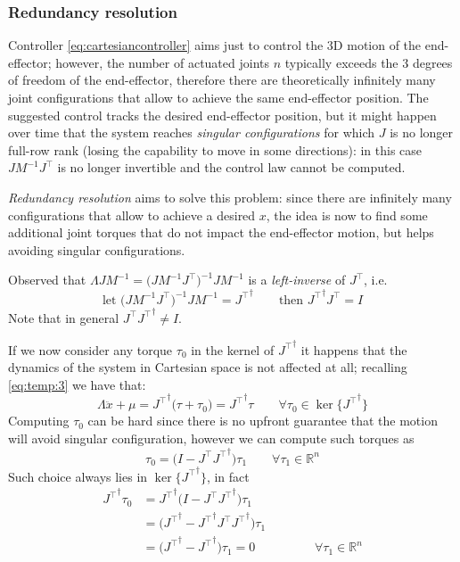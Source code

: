 	\subsubsection{Redundancy resolution} \label{sssec:redundancy}
	Controller \eqref{eq:cartesiancontroller} aims just to control the 3D motion of the end-effector; however, the number of actuated joints $n$ typically exceeds the 3 degrees of freedom of the end-effector, therefore there are theoretically infinitely many joint configurations that allow to achieve the same end-effector position. The suggested control tracks the desired end-effector position, but it might happen over time that the system reaches \textit{singular configurations} for which $J$ is no longer full-row rank (losing the capability to move in some directions): in this case $JM^{-1}J^\top$ is no longer invertible and the control law cannot be computed.
	
	\textit{Redundancy resolution} aims to solve this problem: since there are infinitely many configurations that allow to achieve a desired $x$, the idea is now to find some additional joint torques that do not impact the end-effector motion, but helps avoiding singular configurations.
	
	Observed that $\Lambda JM^{-1} = \big(JM^{-1}J^\top\big)^{-1}JM^{-1}$ is a \textit{left-inverse} of $J^\top$, i.e. 
	\[ \textrm{let } \big(JM^{-1}J^\top\big)^{-1}JM^{-1} = {J^\top}^\dagger \qquad \textrm{then } {J^\top}^\dagger J^\top = I \]
	Note that in general $J^\top {J^\top}^\dagger \neq I$.
	
	If we now consider any torque $\tau_0$ in the kernel of ${J^\top}^\dagger$ it happens that the dynamics of the system in Cartesian space is not affected at all; recalling \eqref{eq:temp:3} we have that:
	\[ \Lambda \ddot x + \mu = {J^\top}^\dagger\big(\tau + \tau_0\big) = {J^\top}^\dagger \tau \qquad \forall \tau_0 \in \ker\{{J^\top}^\dagger\} \]
	Computing $\tau_0$ can be hard since there is no upfront guarantee that the motion will avoid singular configuration, however we can compute such torques as
	\[ \tau_0 = \big(I - J^\top {J^\top}^\dagger \big) \tau_1 \qquad \forall \tau_1 \in \mathds R^n \]
	Such choice always lies in $\ker\{{J^\top}^\dagger\}$, in fact
	\begin{align*}
		{J^\top}^\dagger \tau_0 & = {J^\top}^\dagger \big(I - J^\top {J^\top}^\dagger\big) \tau_1 \\
		& = \big({J^\top}^\dagger - {J^\top}^\dagger J^\top {J^\top}^\dagger\big) \tau_1 \\
		& = \big({J^\top}^\dagger - {J^\top}^\dagger\big) \tau_1 = 0 \hspace{2cm} \forall \tau_1 \in \mathds R^n
	\end{align*}

